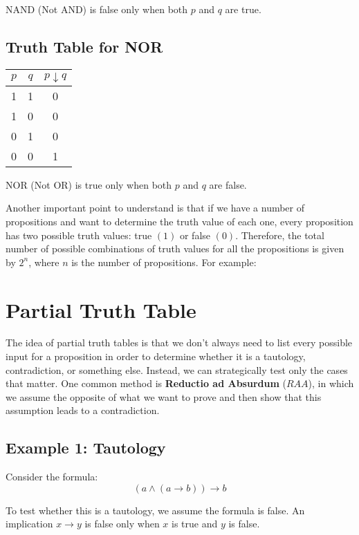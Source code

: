 \documentclass[12pt,a4paper,openany]{article}
\begin{document}
NAND (Not AND) is false only when both \(p\) and \(q\) are true.

\subsection{Truth Table for NOR}\label{truth-table-for-nor}

\begin{center}
\begin{tabular}{|c|c|c|}
\hline
\(p\) & \(q\) & \(p \downarrow q\) \\
\hline
1 & 1 & 0 \\
1 & 0 & 0 \\
0 & 1 & 0 \\
0 & 0 & 1 \\
\hline
\end{tabular}
\end{center}

NOR (Not OR) is true only when both \(p\) and \(q\) are false.

Another important point to understand is that if we have a number of propositions and want to determine the truth value of each one, every proposition has two possible truth values: true \((1)\) or false \((0)\). 
Therefore, the total number of possible combinations of truth values for all the propositions is given by \(2^n\), where \(n\) is the number of propositions. For example:


\section{Partial Truth Table}


The idea of partial truth tables is that we don't always need to list every possible input for a proposition in order to determine whether it is a tautology, contradiction, or something else. 
Instead, we can strategically test only the cases that matter. One common method is \textbf{Reductio ad Absurdum} ($RAA$), in which we assume the opposite of what we want to prove and then show that this assumption leads to a contradiction.

\subsection{Example 1: Tautology}

Consider the formula:
$$ (a \land (a \rightarrow b)) \rightarrow b $$

To test whether this is a tautology, we assume the formula is false. An implication $x \rightarrow y$ is false only when $x$ is true and $y$ is false.
\end{document}
